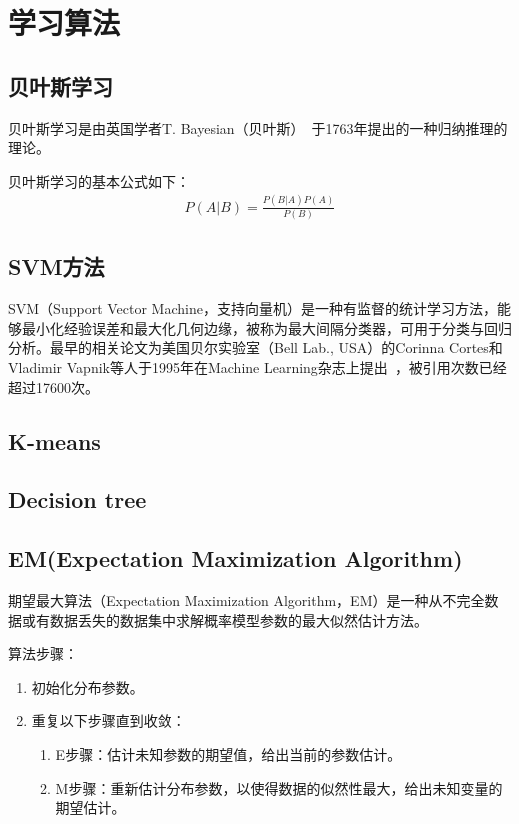 \documentclass[12pt]{article}
\begin{document}
\section{学习算法}

\subsection{贝叶斯学习}

贝叶斯学习是由英国学者T. Bayesian（贝叶斯）~\cite{mr1763essay}于1763年提出的一种归纳推理的理论。

贝叶斯学习的基本公式如下：
\begin{align}
P(A|B) = \frac{P(B|A)P(A)}{P(B)}
\end{align}

\subsection{SVM方法}

SVM（Support Vector Machine，支持向量机）是一种有监督的统计学习方法，能够最小化经验误差和最大化几何边缘，被称为最大间隔分类器，可用于分类与回归分析。最早的相关论文为美国贝尔实验室（Bell Lab., USA）的Corinna Cortes和Vladimir Vapnik等人于1995年在Machine Learning杂志上提出~\cite{cortes1995support}，被引用次数已经超过17600次。

\subsection{K-means}

\subsection{Decision tree}

\subsection{EM(Expectation Maximization Algorithm)}
期望最大算法（Expectation Maximization Algorithm，EM）是一种从不完全数据或有数据丢失的数据集中求解概率模型参数的最大似然估计方法。

{\color{blue}算法步骤}：
\begin{enumerate}
    \item 初始化分布参数。
    \item 重复以下步骤直到收敛：
        \begin{enumerate}
            \item E步骤：估计未知参数的期望值，给出当前的参数估计。
            \item M步骤：重新估计分布参数，以使得数据的似然性最大，给出未知变量的期望估计。
        \end{enumerate}
\end{enumerate}
\end{document}
